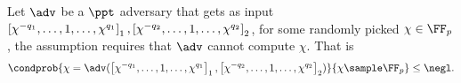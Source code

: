 
\begin{definition}\label{def:ldlog}
  Let $\adv$ be a $\ppt$ adversary that gets as input
  $\left[\chi^{-q_1}, \ldots, 1, \ldots, \chi^{q_1}\right]_{1}, \left[\chi^{-q_2},
    \ldots, 1, \ldots, \chi^{q_2}\right]_{2}$, for some randomly picked
  $\chi \in \FF_p$, the assumption requires that $\adv$ cannot compute $\chi$. That is
	\[
    \condprob{\chi = \adv(\gone{\chi^{-q_1}, \ldots, 1, \ldots,
        \chi^{q_1}}, \gtwo{\chi^{-q_2}, \ldots, 1, \ldots, \chi^{q_2}
      })}{\chi \sample \FF_p} \leq \negl.
	\]
\end{definition}


